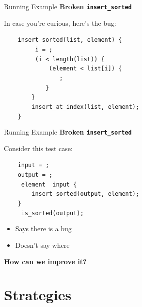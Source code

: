 \documentclass[xcolor=dvipsnames]{beamer}
\begin{document}
\begin{frame}{Running Example}
	\textbf{Broken \texttt{insert\_sorted}}

	\linegap
	In case you're curious, here's the bug:

	\linegap
		\texttt{~~~~insert\_sorted(list,~element)~\{} \\
			\texttt{~~~~~~~~~i~=~;} \\
		\texttt{~~~~~~~~~(i~<~length(list))~\{~} \\
		\texttt{~~~~~~~~~~~~~(element~<~list[i])~\{} \\
		\texttt{~~~~~~~~~~~~~~~~;} \\
		\texttt{~~~~~~~~~~~~\}} \\
		\texttt{~~~~~~~~\}} \\
		\texttt{~~~~~~~~insert\_at\_index(list,~element);} \\
		\texttt{~~~~\}} \\
\end{frame}

\begin{frame}{Running Example}
	\textbf{Broken \texttt{insert\_sorted}}

	\linegap
	Consider this test case:

	\linegap
		\texttt{~~~~input~=~;} \\
		\texttt{~~~~output~=~;} \\
		\texttt{~~~~~element~~input~\{} \\
		\texttt{~~~~~~~~insert\_sorted(output,~element);} \\
		\texttt{~~~~\}} \\
		\texttt{~~~~~is\_sorted(output);~} \\
	\linegap

	\pause
	\begin{itemize}
		\item Says there is a bug
		\item Doesn't say where
	\end{itemize}
	\pause
	{\bf How can we improve it?}
\end{frame}

\section{Strategies}
\end{document}

